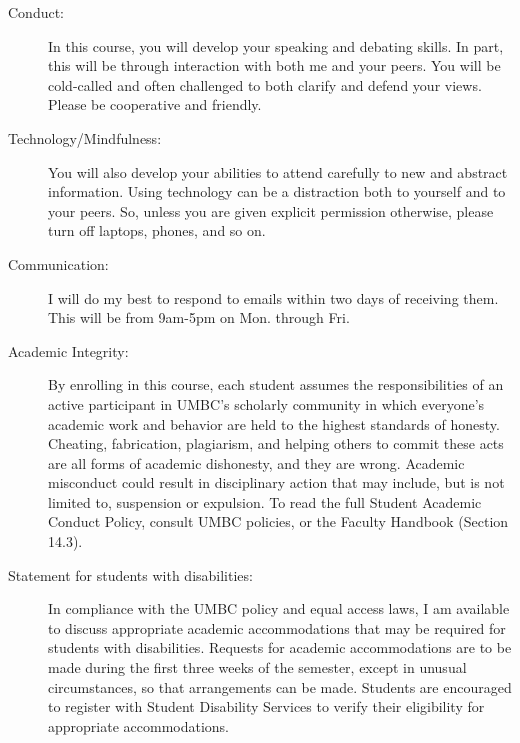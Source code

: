 \documentclass[oneside, 11pt]{article}
\begin{document}
\begin{description}
\item[Conduct:] In this course, you will develop your speaking and debating skills. In part, this will be through interaction with both me and your peers. You will be cold-called and often challenged to both clarify and defend your views. Please be cooperative and friendly.


\item[Technology/Mindfulness:] You will also develop your abilities to attend carefully to new and abstract information. Using technology can be a distraction both to yourself and to your peers. So, unless you are given explicit permission otherwise, please turn off laptops, phones, and so on. 

\item[Communication:] I will do my best to respond to emails within two days of receiving them. This will be from 9am-5pm on Mon. through Fri. 
\item[Academic Integrity:] By enrolling in this course, each student assumes the responsibilities of an active participant in UMBC's scholarly community in which everyone's academic work and behavior are held to the highest standards of honesty. Cheating, fabrication, plagiarism, and helping others to commit these acts are all forms of academic dishonesty, and they are wrong. Academic misconduct could result in disciplinary action that may include, but is not limited to, suspension or expulsion. To read the full Student Academic Conduct Policy, consult UMBC policies, or the Faculty Handbook (Section 14.3).


\item[Statement for students with disabilities:] In compliance with the UMBC policy and equal access laws, I am available to discuss appropriate academic accommodations that may be required for students with disabilities. Requests for academic accommodations are to be made during the first three weeks of the semester, except in unusual circumstances, so that arrangements can be made. Students are encouraged to register with Student Disability Services to verify their eligibility for appropriate accommodations.

\end{description}
\end{document}
